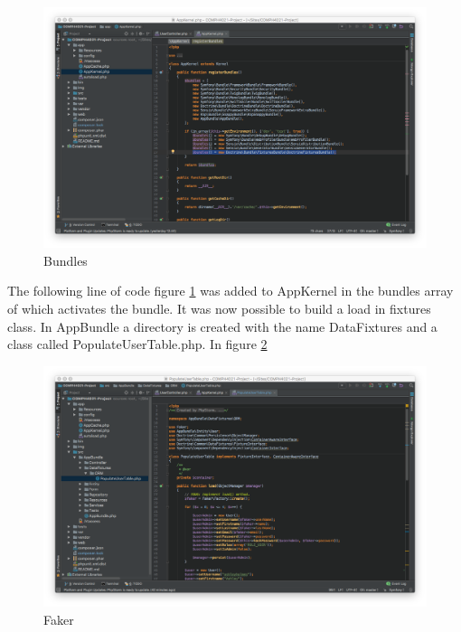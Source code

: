 \begin{figure}[htbp]
   \centering
   \includegraphics[width=400pt]{figures/bundles.png} %
   \caption{Bundles}
   \label{fig:Bundles}
\end{figure}

The following line of code figure \ref{fig:Bundles} was added to AppKernel in the bundles array of which activates the bundle. It was now possible to build a load in fixtures class. In AppBundle a directory is created with the name	 DataFixtures and a class called PopulateUserTable.php. In figure \ref{fig:Faker}

\begin{figure}[htbp]
   \centering
   \includegraphics[width=400pt]{figures/faker.png} %
   \caption{Faker}
   \label{fig:Faker}
\end{figure}

